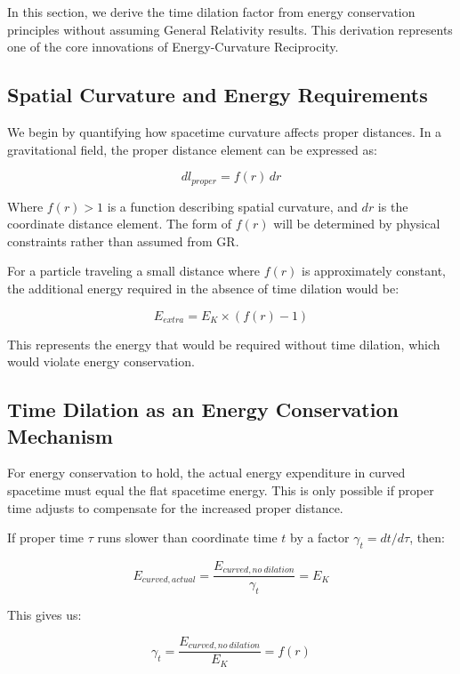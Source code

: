\documentclass[11pt,a4paper]{article}
\begin{document}
In this section, we derive the time dilation factor from energy conservation principles without assuming General Relativity results. This derivation represents one of the core innovations of Energy-Curvature Reciprocity.

\subsection{Spatial Curvature and Energy Requirements}
We begin by quantifying how spacetime curvature affects proper distances. In a gravitational field, the proper distance element can be expressed as:

\begin{equation}
    dl_{proper} = f(r) \, dr
\end{equation}

Where $f(r) > 1$ is a function describing spatial curvature, and $dr$ is the coordinate distance element. The form of $f(r)$ will be determined by physical constraints rather than assumed from GR.

For a particle traveling a small distance where $f(r)$ is approximately constant, the additional energy required in the absence of time dilation would be:

\begin{equation}
    E_{extra} = E_K \times (f(r) - 1)
\end{equation}

This represents the energy that would be required without time dilation, which would violate energy conservation.

\subsection{Time Dilation as an Energy Conservation Mechanism}
For energy conservation to hold, the actual energy expenditure in curved spacetime must equal the flat spacetime energy. This is only possible if proper time adjusts to compensate for the increased proper distance.

If proper time $\tau$ runs slower than coordinate time $t$ by a factor $\gamma_t = dt/d\tau$, then:

\begin{equation}
    E_{curved, actual} = \frac{E_{curved, no\:dilation}}{\gamma_t} = E_K
\end{equation}

This gives us:

\begin{equation}
    \gamma_t = \frac{E_{curved, no\:dilation}}{E_K} = f(r)
\end{equation}
\end{document}
